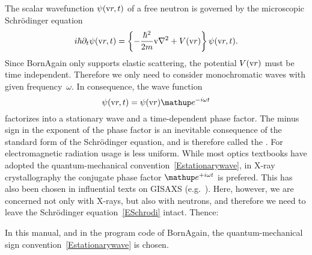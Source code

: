 \def\Vmac{\tilde{V}}

%
The scalar wavefunction $\psi(\text{v}{r},t)$
%
%
%
of a free neutron
is governed by the microscopic Schrödinger equation
\begin{equation}\label{ESchrodi}
  i\hbar\partial_t \psi(\text{v}{r},t)
  = \left\{-\frac{\hbar^2}{2m}\text{v}{\nabla}^2+V(\text{v}{r})\right\} \psi(\text{v}{r},t).
\end{equation}
Since BornAgain only supports elastic scattering,
%
%
the potential $V(\text{v}{r})$ must be time independent.
%
Therefore we only need to consider monochromatic waves
%
%
with given frequency~$\omega$.
%
In consequence, the wave function
\begin{equation}\label{Estationarywave}
  \psi(\r,t) = \psi(\r)\e^{-i\omega t}
\end{equation}
%
factorizes into a stationary wave and a time-dependent phase factor.
%
%
The minus sign in the exponent of the phase factor
is an inevitable consequence of the standard form of the Schrödinger equation,
and is therefore called the .
%
%
%
For electromagnetic radiation
usage is less uniform.
While most optics textbooks
have adopted the quantum-mechanical convention~\cref{Estationarywave},
%
in X-ray crystallography
the conjugate phase factor $\e^{+i\omega t}$ is prefered.
This 
%
has also been chosen
in influential texts on GISAXS (e.g.\ \cite{ReLL09}).
Here, however, we are concerned not only with X-rays,
but also with neutrons,
and therefore we need to leave the Schrödinger equation~\cref{ESchrodi} intact.
Thence:

\Note
{\indent In this manual, and in the program code of BornAgain,
the quantum-mechanical sign convention~\cref{Estationarywave} is chosen.}
%

